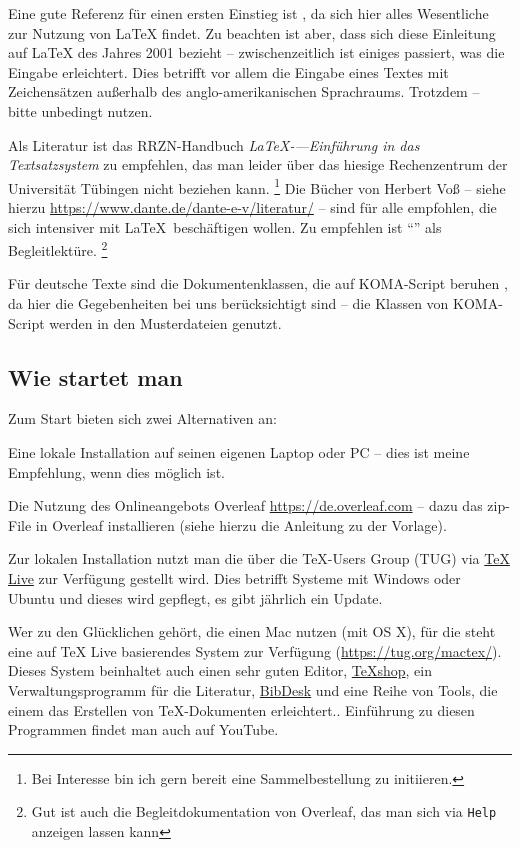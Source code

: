 Eine gute Referenz für einen ersten Einstieg ist \textcite{lshort-german}, da sich hier alles Wesentliche zur Nutzung von \LaTeX{} findet.
Zu beachten ist aber, dass sich diese Einleitung auf \LaTeX{} des Jahres 2001 bezieht -- zwischenzeitlich ist einiges passiert, was die Eingabe erleichtert.
Dies betrifft vor allem die Eingabe eines Textes mit Zeichensätzen außerhalb des anglo-amerikanischen Sprachraums.
Trotzdem -- bitte unbedingt nutzen.

Als Literatur ist das RRZN-Handbuch \emph{ \LaTeX{}-—Einführung in das Textsatzsystem} zu empfehlen, das man leider über das hiesige Rechenzentrum der Universität Tübingen nicht beziehen kann.%
\footnote{Bei Interesse bin ich gern bereit eine Sammelbestellung zu initiieren.} 
Die Bücher von Herbert Voß -- siehe hierzu \url{https://www.dante.de/dante-e-v/literatur/} -- sind für alle empfohlen, die sich intensiver mit \LaTeX\ beschäftigen wollen.
Zu empfehlen ist \textcite{voss:2012a} \enquote{} als Begleitlektüre.%
\footnote{Gut ist auch die Begleitdokumentation von Overleaf, das man sich via \texttt{Help} anzeigen lassen kann}

Für deutsche Texte sind die Dokumentenklassen, die auf KOMA-Script beruhen \textcite{kohm:2020}, da hier die Gegebenheiten bei uns berücksichtigt sind -- die Klassen von KOMA-Script werden in den Musterdateien genutzt.

\subsection{Wie startet man}
Zum Start bieten sich zwei Alternativen an:
%
\begin{myitemize}[nosep]
	\item 
	Eine lokale Installation auf seinen eigenen Laptop oder PC -- dies ist meine Empfehlung, wenn dies möglich ist.
	
	\item
	Die Nutzung des Onlineangebots Overleaf \url{https://de.overleaf.com} -- dazu das zip-File in Overleaf installieren
	(siehe hierzu die Anleitung zu der Vorlage).
	
\end{myitemize}
%
Zur lokalen Installation nutzt man die über die \TeX-Users Group (TUG) via \href{https://tug.org/texlive/}{TeX Live} zur Verfügung gestellt wird. 
Dies betrifft Systeme mit Windows oder Ubuntu und dieses wird gepflegt, \dh es gibt jährlich ein Update.

Wer zu den Glücklichen gehört, die einen Mac nutzen (mit OS X), für die steht eine auf TeX Live basierendes System zur Verfügung (\url{https://tug.org/mactex/}).
Dieses System beinhaltet auch einen sehr guten Editor, \href{https://pages.uoregon.edu/koch/texshop/}{TeXshop}, ein Verwaltungsprogramm für die Literatur, \href{https://bibdesk.sourceforge.io}{BibDesk} und eine Reihe von Tools, die einem das Erstellen von \TeX{}-Dokumenten erleichtert..
Einführung zu diesen Programmen findet man auch auf YouTube.

